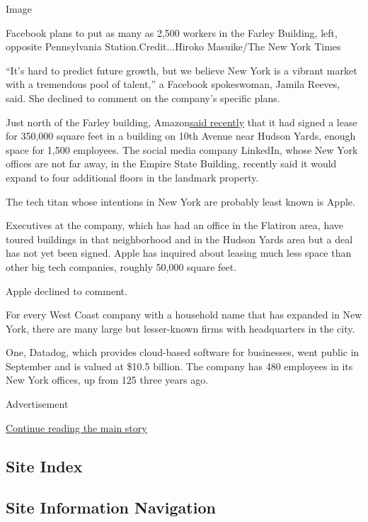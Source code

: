 Image

Facebook plans to put as many as 2,500 workers in the Farley Building,
left, opposite Pennsylvania Station.Credit...Hiroko Masuike/The New York
Times

``It's hard to predict future growth, but we believe New York is a
vibrant market with a tremendous pool of talent,'' a Facebook
spokeswoman, Jamila Reeves, said. She declined to comment on the
company's specific plans.

Just north of the Farley building,
Amazon\href{https://www.nytimes3xbfgragh.onion/2019/12/06/nyregion/amazon-hudson-yards.html}{said
recently} that it had signed a lease for 350,000 square feet in a
building on 10th Avenue near Hudson Yards, enough space for 1,500
employees. The social media company LinkedIn, whose New York offices are
not far away, in the Empire State Building, recently said it would
expand to four additional floors in the landmark property.

The tech titan whose intentions in New York are probably least known is
Apple.

Executives at the company, which has had an office in the Flatiron area,
have toured buildings in that neighborhood and in the Hudson Yards area
but a deal has not yet been signed. Apple has inquired about leasing
much less space than other big tech companies, roughly 50,000 square
feet.

Apple declined to comment.

For every West Coast company with a household name that has expanded in
New York, there are many large but lesser-known firms with headquarters
in the city.

One, Datadog, which provides cloud-based software for businesses, went
public in September and is valued at \$10.5 billion. The company has 480
employees in its New York offices, up from 125 three years ago.

Advertisement

\protect\hyperlink{after-bottom}{Continue reading the main story}

\hypertarget{site-index}{%
\subsection{Site Index}\label{site-index}}

\hypertarget{site-information-navigation}{%
\subsection{Site Information
Navigation}\label{site-information-navigation}}

